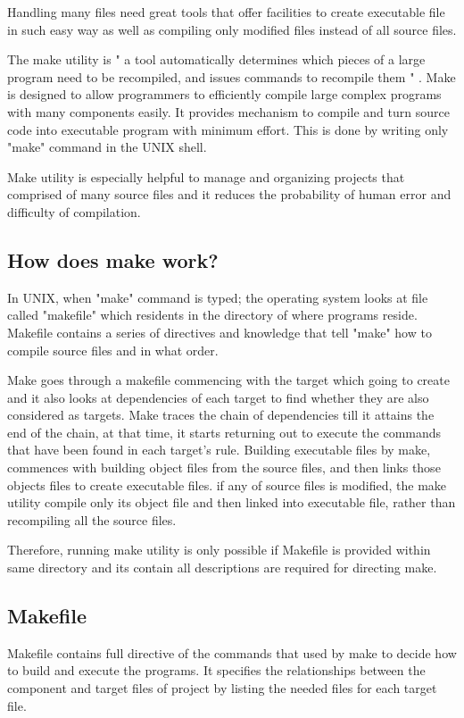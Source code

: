 \documentclass[11pt]{report}
\begin{document}
Handling many files need great tools that offer facilities to create executable file in such easy way as well as compiling only modified files instead of all source files.

The make utility is " a tool automatically determines which pieces of a large program need to be recompiled, and issues commands to recompile them " \cite{Stallman:2000:GnuMake}. Make is designed to allow programmers to efficiently compile large complex programs with many components easily. It provides mechanism to compile and turn source code into executable program with minimum effort. This is done by writing only "make" command in the UNIX shell.  

Make utility is especially helpful to manage and organizing projects that comprised of many source files and it reduces the probability of human error and difficulty of compilation.

\subsection{How does make work?}
\label{subsec: how make work}
In UNIX, when "make" command is typed; the operating system looks at file called "makefile" which residents in the directory of where programs reside. Makefile contains a series of directives and knowledge that tell "make" how to compile source files and in what order. 

Make goes through a makefile commencing with the target which going to create and it also looks at dependencies  of each target to find whether they are also considered as targets.  Make traces the chain of dependencies till it attains the end of the chain, at that time, it starts returning out to execute the commands that have been found in each target's rule. Building executable files by make, commences with building object files from the source files, and then links those objects files to create executable files. if any of source files is modified, the make utility compile only its object file and then linked into executable file, rather than recompiling all the source files. 

Therefore, running make utility is only possible if Makefile is provided within same directory and its contain all descriptions are required for directing make.

\subsection{Makefile}
\label{subsec: makefile}
Makefile contains full directive of the commands that used by make to decide how to build and execute the programs. It specifies the relationships between the component and target files of project by listing the needed files for each target file.
\end{document}
